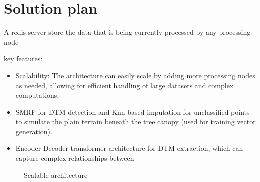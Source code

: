 \section{Solution plan}
A redis server store the data that is being currently processed by any processing node

key features:
\begin{itemize}
    \item Scalability: The architecture can easily scale by adding more processing nodes as needed, allowing for efficient handling of large datasets and complex computations.
    \item \ac{SMRF} for DTM detection and Knn based imputation for unclassified points to simulate the plain terrain beneath the tree canopy (used for training vector generation).
    \item Encoder-Decoder transformer architecture for DTM extraction, which can capture complex relationships between
\end{itemize}


\begin{figure}
	\centering
	\caption{Scalable architecture}
	\label{fig:Scaling plan}
\end{figure}